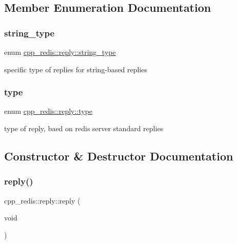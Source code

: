 \subsection{Member Enumeration Documentation}
\mbox{\label{classcpp__redis_1_1reply_ac192ba4cb8f2bb6e7cb465edf755328b}} 
\subsubsection{\texorpdfstring{string\+\_\+type}{string\_type}}
{\footnotesize\ttfamily enum \mbox{\hyperlink{classcpp__redis_1_1reply_ac192ba4cb8f2bb6e7cb465edf755328b}{cpp\+\_\+redis\+::reply\+::string\+\_\+type}}\hspace{0.3cm}{\ttfamily [strong]}}

specific type of replies for string-\/based replies \mbox{\label{classcpp__redis_1_1reply_acc272b2a52164cac1d110c619a0b25bd}} 
\subsubsection{\texorpdfstring{type}{type}}
{\footnotesize\ttfamily enum \mbox{\hyperlink{classcpp__redis_1_1reply_acc272b2a52164cac1d110c619a0b25bd}{cpp\+\_\+redis\+::reply\+::type}}\hspace{0.3cm}{\ttfamily [strong]}}

type of reply, baed on redis server standard replies 

\subsection{Constructor \& Destructor Documentation}
\mbox{\label{classcpp__redis_1_1reply_a8d0b1f8a18b5c7c3ce79784604dba6cc}} 
\subsubsection{\texorpdfstring{reply()}{reply()}\hspace{0.1cm}{\footnotesize\ttfamily [1/4]}}
{\footnotesize\ttfamily cpp\+\_\+redis\+::reply\+::reply (\begin{DoxyParamCaption}\item[{void}]{ }\end{DoxyParamCaption})}

